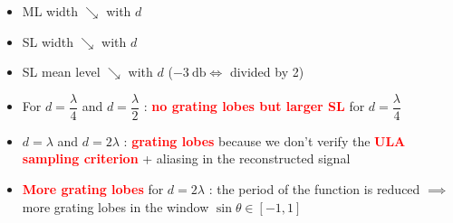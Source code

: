 \documentclass[UKenglish,8pt,aspectratio=1610]{beamer}
\begin{document}
\begin{frame}
\begin{columns}
\begin{column}{0.35\textwidth}
		\begin{itemize}
			\item ML width $\searrow$ with $d$
			\item SL width $\searrow$ with $d$
			\item SL mean level $\searrow$ with $d$ ($-3~\si{\decibel}\Longleftrightarrow$ divided by 2)
			\item For $d=\dfrac{\lambda}{4}$ and  $d=\dfrac{\lambda}{2}$ : \textcolor{red}{\textbf{no grating lobes but larger SL}} for $d=\dfrac{\lambda}{4}$
			\item $d=\lambda$ and $d=2\lambda$ : \textcolor{red}{\textbf{grating lobes}} because we don't verify the \textcolor{red}{\textbf{ULA sampling criterion}} + aliasing in the reconstructed signal
			\item \textcolor{red}{\textbf{More grating lobes}} for $d=2\lambda$ : the period of the function is reduced $\implies$ more grating lobes in the window $\sin\theta\in[-1,1]$
		\end{itemize}
	\end{column}
\end{columns}

\end{frame}
\end{document}
